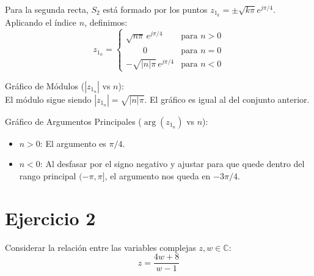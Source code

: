 \documentclass[a4paper, 12pt]{article}
\begin{document}
Para la segunda recta, $S_2$ está formado por los puntos $z_{1_k} = \pm \sqrt{k\pi} e^{j\pi/4}$. Aplicando el índice $n$, definimos:
\[
z_{1_n}= \begin{cases} 
\sqrt{n\pi} \, e^{j\pi/4} & \text{para } n > 0 \\

\qquad0 & \text{para } n = 0 \\
-\sqrt{|n|\pi} \, e^{j\pi/4} & \text{para } n < 0 
\end{cases}
\]

\vspace{0.3cm}
\noindent Gráfico de Módulos ($|z_{1_n}|$ vs $n$): \\
El módulo sigue siendo $|z_{1_n}| = \sqrt{|n|\pi}$. El gráfico es igual al del conjunto anterior.

\vspace{0.3cm}

\noindent Gráfico de Argumentos Principales ($\arg(z_{1_n})$ vs $n$): 
\begin{itemize}
    \item $n > 0$: El argumento es $\pi/4$.
    \item $n < 0$: Al desfasar por el signo negativo y ajustar para que quede dentro del rango principal $(-\pi, \pi]$, el argumento nos queda en $-3\pi/4$.
\end{itemize}

\begin{center}
\end{center}
\newpage
		\section{Ejercicio 2}
Considerar la relación entre las variables complejas $z, w \in \mathbb{C}$:
\[
z = \frac{4w + 8}{w - 1}
\]
\end{document}
